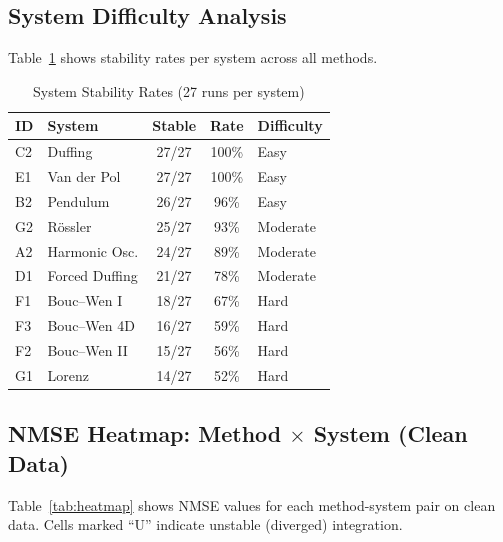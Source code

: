 \subsection{System Difficulty Analysis}

Table~\ref{tab:system_stability} shows stability rates per system across all methods.

\begin{table}[!ht]
\centering
\caption{System Stability Rates (27 runs per system)}
\label{tab:system_stability}
\begin{tabular}{@{}llccl@{}}
\toprule
\textbf{ID} & \textbf{System} & \textbf{Stable} & \textbf{Rate} & \textbf{Difficulty} \\
\midrule
C2 & Duffing & 27/27 & 100\% & Easy \\
E1 & Van der Pol & 27/27 & 100\% & Easy \\
B2 & Pendulum & 26/27 & 96\% & Easy \\
G2 & R\"{o}ssler & 25/27 & 93\% & Moderate \\
A2 & Harmonic Osc. & 24/27 & 89\% & Moderate \\
D1 & Forced Duffing & 21/27 & 78\% & Moderate \\
F1 & Bouc--Wen I & 18/27 & 67\% & Hard \\
F3 & Bouc--Wen 4D & 16/27 & 59\% & Hard \\
F2 & Bouc--Wen II & 15/27 & 56\% & Hard \\
G1 & Lorenz & 14/27 & 52\% & Hard \\
\bottomrule
\end{tabular}
\end{table}

\subsection{NMSE Heatmap: Method $\times$ System (Clean Data)}

Table~\ref{tab:heatmap} shows NMSE values for each method-system pair on clean data. Cells marked ``U'' indicate unstable (diverged) integration.

